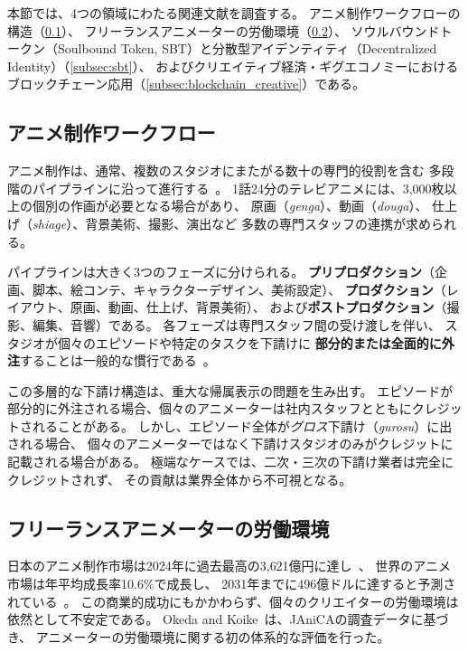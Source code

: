 
本節では、4つの領域にわたる関連文献を調査する。
アニメ制作ワークフローの構造（\cref{subsec:anime_workflow}）、
フリーランスアニメーターの労働環境（\cref{subsec:labor}）、
ソウルバウンドトークン（Soulbound Token, SBT）と分散型アイデンティティ（Decentralized Identity）（\cref{subsec:sbt}）、
およびクリエイティブ経済・ギグエコノミーにおけるブロックチェーン応用（\cref{subsec:blockchain_creative}）である。

\subsection{アニメ制作ワークフロー}
\label{subsec:anime_workflow}

アニメ制作は、通常、複数のスタジオにまたがる数十の専門的役割を含む
多段階のパイプラインに沿って進行する~\cite{condry2013soul, animechain2024whitepaper}。
1話24分のテレビアニメには、3{,}000枚以上の個別の作画が必要となる場合があり、
原画（\textit{genga}）、動画（\textit{douga}）、
仕上げ（\textit{shiage}）、背景美術、撮影、演出など
多数の専門スタッフの連携が求められる。

パイプラインは大きく3つのフェーズに分けられる。
\textbf{プリプロダクション}（企画、脚本、絵コンテ、キャラクターデザイン、美術設定）、
\textbf{プロダクション}（レイアウト、原画、動画、仕上げ、背景美術）、
および\textbf{ポストプロダクション}（撮影、編集、音響）である。
各フェーズは専門スタッフ間の受け渡しを伴い、
スタジオが個々のエピソードや特定のタスクを下請けに
\textbf{部分的または全面的に外注}することは一般的な慣行である~\cite{nippon2024anime}。

この多層的な下請け構造は、重大な帰属表示の問題を生み出す。
エピソードが部分的に外注される場合、個々のアニメーターは社内スタッフとともにクレジットされることがある。
しかし、エピソード全体が\textit{グロス}下請け（\textit{gurosu}）に出される場合、
個々のアニメーターではなく下請けスタジオのみがクレジットに記載される場合がある。
極端なケースでは、二次・三次の下請け業者は完全にクレジットされず、
その貢献は業界全体から不可視となる。

\subsection{フリーランスアニメーターの労働環境}
\label{subsec:labor}

日本のアニメ制作市場は2024年に過去最高の3{,}621億円に達し~\cite{tdb2025anime}、
世界のアニメ市場は年平均成長率10.6\%で成長し、
2031年までに496億ドルに達すると予測されている~\cite{mordor2026anime}。
この商業的成功にもかかわらず、個々のクリエイターの労働環境は依然として不安定である。
Okeda and Koike~\cite{okeda2011animators}は、JAniCAの調査データに基づき、
アニメーターの労働環境に関する初の体系的な評価を行った。

